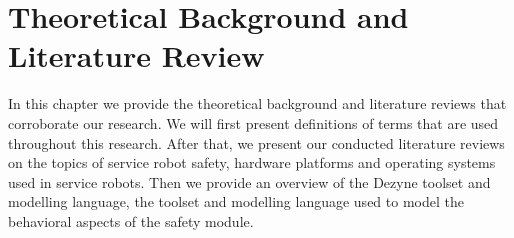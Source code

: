 \documentclass[12pt]{scrreprt}
\begin{document}
\chapter{Theoretical Background and Literature Review}
In this chapter we provide the theoretical background and literature reviews that corroborate our research. We will first present definitions of terms that are used throughout this research. After that, we present our conducted literature reviews on the topics of service robot safety, hardware platforms and operating systems used in service robots. Then we provide an overview of the Dezyne toolset and modelling language, the toolset and modelling language used to model the behavioral aspects of the safety module.
\label{Theoretical Background}

\end{document}
